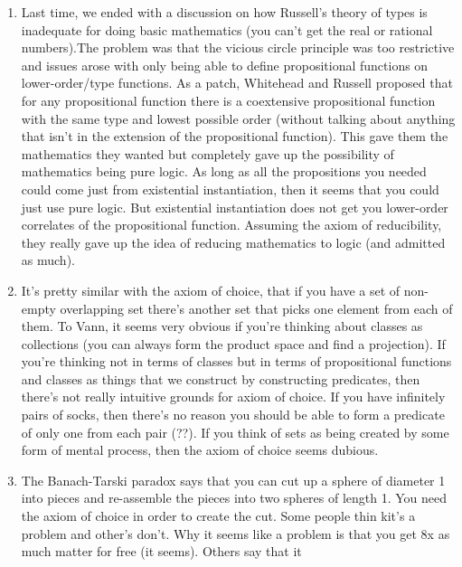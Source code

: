 \documentclass[12pt]{article}
\theoremstyle{definition}
\begin{document}
\begin{enumerate}
    \itemsep0em 
    \item 
        Last time, we ended with a discussion on how Russell's theory of types
        is inadequate for doing basic mathematics (you can't get the real or
        rational numbers).The problem was that the vicious circle principle was
        too restrictive and issues arose with only being able to define
        propositional functions on lower-order/type functions. As a patch,
        Whitehead and Russell proposed that for any propositional function
        there is a coextensive propositional function with the same type and
        lowest possible order (without talking about anything that isn't in the
        extension of the propositional function). This gave them the
        mathematics they wanted but completely gave up the possibility of
        mathematics being pure logic. As long as all the propositions you
        needed could come just from existential instantiation, then it seems
        that you could just use pure logic. But existential instantiation does
        not get you lower-order correlates of the propositional function.
        Assuming the axiom of reducibility, they really gave up the idea of
        reducing mathematics to logic (and admitted as much).
    \item
       It's pretty similar with the axiom of choice, that if you have a set of
       non-empty overlapping set there's another set that picks one element
       from each of them. To Vann, it seems very obvious if you're thinking
       about classes as collections (you can always form the product space and
       find a projection). If you're thinking not in terms of classes but in
       terms of propositional functions and classes as things that we construct
       by constructing predicates, then there's not really intuitive grounds
       for axiom of choice. If you have infinitely pairs of socks, then there's
       no reason you should be able to form a predicate of only one from each
       pair (??). If you think of sets as being created by some form of mental
       process, then the axiom of choice seems dubious.
    \item
        The Banach-Tarski paradox says that you can cut up a sphere of diameter
        1 into pieces and re-assemble the pieces into two spheres of length 1.
        You need the axiom of choice in order to create the cut. Some people
        thin kit's a problem and other's don't. Why it seems like a problem is
        that you get 8x as much matter for free (it seems). Others say that it

\end{enumerate}
\end{document}
